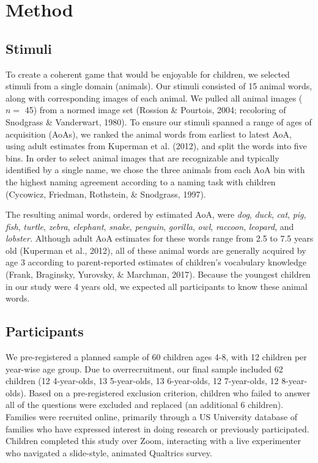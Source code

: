 \documentclass[10pt, letterpaper]{article}
\begin{document}
\hypertarget{method}{%
\section{Method}\label{method}}

\hypertarget{stimuli}{%
\subsection{Stimuli}\label{stimuli}}

To create a coherent game that would be enjoyable for children, we
selected stimuli from a single domain (animals). Our stimuli consisted
of 15 animal words, along with corresponding images of each animal. We
pulled all animal images (\(n =\) 45) from a normed image set (Rossion
\& Pourtois, 2004; recoloring of Snodgrass \& Vanderwart, 1980). To
ensure our stimuli spanned a range of ages of acquisition (AoAs), we
ranked the animal words from earliest to latest AoA, using adult
estimates from Kuperman et al. (2012), and split the words into five
bins. In order to select animal images that are recognizable and
typically identified by a single name, we chose the three animals from
each AoA bin with the highest naming agreement according to a naming
task with children (Cycowicz, Friedman, Rothstein, \& Snodgrass, 1997).

The resulting animal words, ordered by estimated AoA, were \emph{dog},
\emph{duck}, \emph{cat}, \emph{pig}, \emph{fish}, \emph{turtle},
\emph{zebra}, \emph{elephant}, \emph{snake}, \emph{penguin},
\emph{gorilla}, \emph{owl}, \emph{raccoon}, \emph{leopard}, and
\emph{lobster.} Although adult AoA estimates for these words range from
2.5 to 7.5 years old (Kuperman et al., 2012), all of these animal words
are generally acquired by age 3 according to parent-reported estimates
of children's vocabulary knowledge (Frank, Braginsky, Yurovsky, \&
Marchman, 2017). Because the youngest children in our study were 4 years
old, we expected all participants to know these animal words.

\hypertarget{participants}{%
\subsection{Participants}\label{participants}}

We pre-registered a planned sample of 60 children ages 4-8, with 12
children per year-wise age group. Due to overrecruitment, our final
sample included 62 children (12 4-year-olds, 13 5-year-olds, 13
6-year-olds, 12 7-year-olds, 12 8-year-olds). Based on a pre-registered
exclusion criterion, children who failed to answer all of the questions
were excluded and replaced (an additional 6 children). Families were
recruited online, primarily through a US University database of families
who have expressed interest in doing research or previously
participated. Children completed this study over Zoom, interacting with
a live experimenter who navigated a slide-style, animated Qualtrics
survey.
\end{document}
